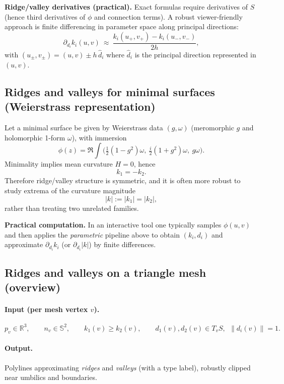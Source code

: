 \documentclass[12pt,a4paper]{article}
\theoremstyle{plain}
\theoremstyle{definition}      %
\begin{document}
\medskip
\noindent
\textbf{Ridge/valley derivatives (practical).}
Exact formulas require derivatives of $S$ (hence third derivatives of $\phi$ and connection terms).
A robust viewer-friendly approach is finite differencing in parameter space along principal directions:
\[
\partial_{d_i}k_i(u,v)\ \approx\ \frac{k_i(u_+,v_+)-k_i(u_-,v_-)}{2h},
\]
with $(u_\pm,v_\pm)=(u,v)\pm h\,\hat d_i$ where $\hat d_i$ is the principal direction represented in $(u,v)$.

\subsection*{Ridges and valleys for minimal surfaces (Weierstrass representation)}

Let a minimal surface be given by Weierstrass data $(g,\omega)$ (meromorphic $g$ and holomorphic 1-form $\omega$),
with immersion
\[
\phi(z)=\Re\int \Big(\tfrac12(1-g^2)\omega,\ \tfrac{i}{2}(1+g^2)\omega,\ g\omega\Big).
\]
Minimality implies mean curvature $H=0$, hence
\[
k_1 = -k_2.
\]
Therefore ridge/valley structure is symmetric, and it is often more robust to study extrema of the curvature
magnitude
\[
|k|:=|k_1|=|k_2|,
\]
rather than treating two unrelated families.

\medskip
\noindent
\textbf{Practical computation.}
In an interactive tool one typically samples $\phi(u,v)$ and then applies the \emph{parametric} pipeline above
to obtain $(k_i,d_i)$ and approximate $\partial_{d_i}k_i$ (or $\partial_{d_i}|k|$) by finite differences.

	
	
	
	\subsection*{Ridges and valleys on a triangle mesh (overview)}
	
	\paragraph{Input (per mesh vertex $v$).}
	\[
	p_v\in\mathbb{R}^3,\qquad n_v\in\mathbb{S}^2,\qquad
	k_1(v)\ge k_2(v),\qquad
	d_1(v),d_2(v)\in T_vS,\ \ \|d_i(v)\|=1.
	\]
	
	\paragraph{Output.}
	Polylines approximating \emph{ridges} and \emph{valleys} (with a type label), robustly clipped near
	umbilics and boundaries.
	
\end{document}
